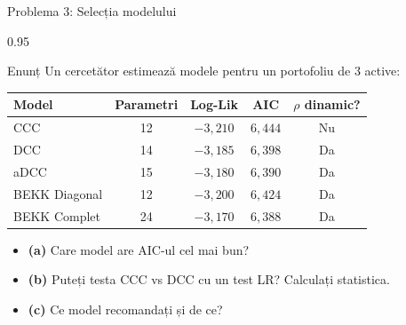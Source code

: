 \documentclass[9pt, aspectratio=169, t]{beamer}
\begin{document}
\begin{frame}{Problema 3: Selecția modelului}
    \begin{cminipage}{0.95\textwidth}
    \begin{block}{Enunț}
        Un cercetător estimează modele pentru un portofoliu de 3 active:

        \vspace{0.3cm}
        \begin{center}
        {\footnotesize
            \begin{tabular}{lcccc}
                \toprule
                \textbf{Model} & \textbf{Parametri} & \textbf{Log-Lik} & \textbf{AIC} & \textbf{$\rho$ dinamic?} \\
                \midrule
                CCC & 12 & $-3{,}210$ & $6{,}444$ & Nu \\
                DCC & 14 & $-3{,}185$ & $6{,}398$ & Da \\
                aDCC & 15 & $-3{,}180$ & $6{,}390$ & Da \\
                BEKK Diagonal & 12 & $-3{,}200$ & $6{,}424$ & Da \\
                BEKK Complet & 24 & $-3{,}170$ & $6{,}388$ & Da \\
                \bottomrule
            \end{tabular}
        }
        \end{center}

        \vspace{0.3cm}
        \begin{itemize}\setlength{\itemsep}{0pt}
            \item \textbf{(a)} Care model are AIC-ul cel mai bun?
            \item \textbf{(b)} Puteți testa CCC vs DCC cu un test LR? Calculați statistica.
            \item \textbf{(c)} Ce model recomandați și de ce?
        \end{itemize}
    \end{block}
    \end{cminipage}
\end{frame}
\end{document}
